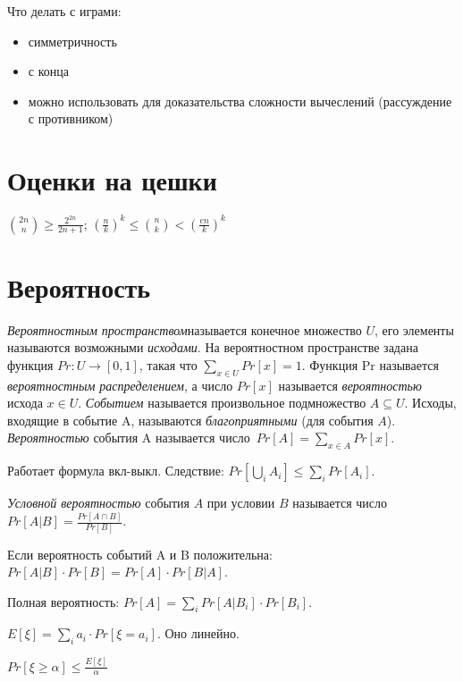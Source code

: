 \documentclass{article}
\renewcommand{\geq}{\geqslant}
\renewcommand{\leq}{\leqslant}
\newenvironment{theorem}[2][Т]{\begin{trivlist}
\item[\hskip \labelsep {\bfseries #1}\hskip \labelsep {\bfseries #2.}]}{\end{trivlist}}
\newenvironment{lemma}[2][Л]{\begin{trivlist}
\item[\hskip \labelsep {\bfseries #1}\hskip \labelsep {\bfseries #2.}]}{\end{trivlist}}
\newenvironment{definition}[2][О]{\begin{trivlist}
\item[\hskip \labelsep {\bfseries #1}\hskip \labelsep {\bfseries #2}]}{\end{trivlist}}
\begin{document}
Что делать с играми:
\begin{itemize}
    \item симметричность
    \item с конца
    \item можно использовать для доказательства сложности вычеслений (рассуждение с противником)
\end{itemize}

\section{Оценки на цешки}
$\binom{2n}{n} \geq \frac{2^{2n}}{2n + 1}$;
${\left(\frac{n}{k}\right)}^k \leq \binom{n}{k} < {\left(\frac{en}{k}\right)}^k$

\section{Вероятность}
\textit{Вероятностным пространством}называется конечное множество $U$, его элементы называются возможными \textit{исходами}. На
вероятностном пространстве задана функция $Pr: U \to [0, 1]$, такая что 
$\sum_{x \in U} Pr[x] = 1$. Функция Pr называется \textit{вероятностным распределением}, а число $Pr[x]$ называется \textit{вероятностью} исхода $x \in U$. \textit{Событием} называется произвольное подмножество $A \subseteq U$. Исходы, входящие в событие A, называются \textit{благоприятными} (для события $A$). \textit{Вероятностью} события A называется число~$Pr[A] = \sum_{x\in A} Pr[x]$.

Работает формула вкл-выкл. Следствие: $Pr[\bigcup_{i} A_i] \leq \sum_{i} Pr[A_i]$.

\textit{Условной вероятностью} события $A$ при условии $B$ называется число $Pr[A|B] = \frac{Pr[A \cap B]}{Pr[B]}$.

\begin{theorem}{Байеса}
Если вероятность событий A и B положительна: $Pr[A|B] \cdot Pr[B] = Pr[A] \cdot Pr[B|A]$.
\end{theorem}

Полная вероятность: $Pr[A] = \sum_{i} Pr[A|B_i] \cdot Pr[B_i]$.

\begin{definition}{Мат. ожидание.}
$E[\xi] = \sum_{i} a_i \cdot Pr[\xi = a_i]$. Оно линейно.
\end{definition}

\begin{lemma}{Неравенство Маркова}
$Pr[\xi \geq \alpha] \leq \frac{E[\xi]}{\alpha}$
\end{lemma}


\end{document}
